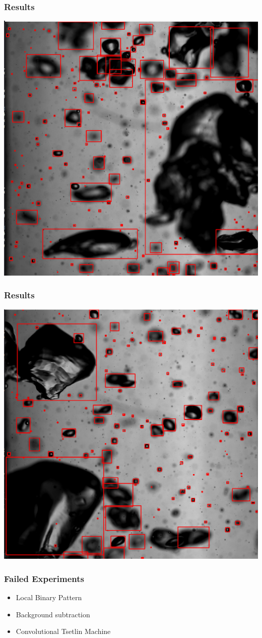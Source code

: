 \documentclass{beamer}
\begin{document}
\begin{frame}
    \frametitle{Results}
    \begin{center}
        \includegraphics[width=0.8\columnwidth]{bubble-detection}
    \end{center}
\end{frame}

\begin{frame}
    \frametitle{Results}
    \begin{center}
        \includegraphics[width=0.8\columnwidth]{bubble-detection-2}
    \end{center}
\end{frame}

\begin{frame}
    \frametitle{Failed Experiments}

    \begin{itemize}
        \item Local Binary Pattern
        \item Background subtraction
        \item Convolutional Tsetlin Machine
    \end{itemize}

\end{frame}
\end{document}
